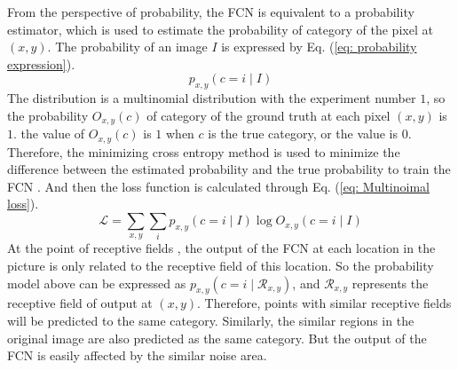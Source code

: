 From the perspective of probability, the FCN is equivalent to a probability estimator, which is used to estimate the probability of category of the pixel at $(x,y)$. The probability of an image $I$ is expressed by Eq. (\ref{eq: probability expression}).
\begin{equation}\label{eq: probability expression}
    p_{x,y}(c=i \mid I)
\end{equation}
The distribution is a multinomial distribution with the experiment number $1$, so the probability $O_{x,y}(c)$ of category of the ground truth at each pixel $(x,y)$ is $1$. the value of $O_{x,y}(c)$ is $1$ when $c$ is the true category, or the value is $0$. Therefore, the minimizing cross entropy method is used to minimize the difference between the estimated probability and the true probability to train the FCN \cite{CNN:kingma2013auto}. And then the loss function is calculated through Eq. (\ref{eq: Multinoimal loss}).
\begin{equation}\label{eq: Multinoimal loss}
  \mathcal{L} = \sum_{x,y} \sum_{i}p_{x,y}(c=i\mid I)\log O_{x,y}(c=i\mid I)
\end{equation}
At the point of receptive fields \cite{CNN:hubel1962receptive}, the output of the FCN at each location in the picture is only related to the receptive field of this location. So the probability model above can be expressed as $p_{x,y}(c=i \mid \mathcal{R}_{x,y})$, and $\mathcal{R}_{x,y}$ represents the receptive field of output at $(x,y)$. Therefore, points with similar receptive fields will be predicted to the same category. Similarly, the similar regions in the original image are also predicted as the same category. But the output of the FCN is easily affected by the similar noise area.
